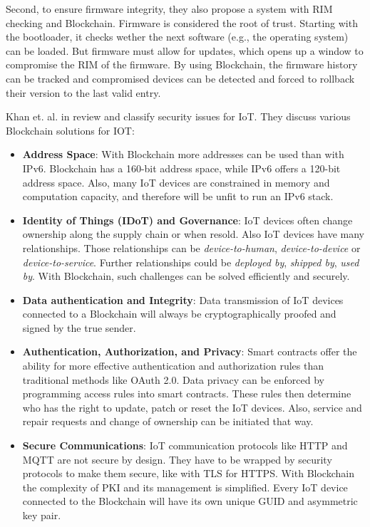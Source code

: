 Second, to ensure firmware integrity, they also propose a system with RIM checking and Blockchain.
Firmware is considered the root of trust. Starting with the bootloader, it checks wether the next software (e.g., the operating system) can be loaded.
But firmware must allow for updates, which opens up a window to compromise the RIM of the firmware. By using Blockchain, the firmware history can be tracked and compromised devices can be detected and forced to rollback their
version to the last valid entry.

Khan et. al. in \cite{Khan2018} review and classify security issues for IoT. They discuss various Blockchain solutions for IOT:

\begin{itemize}
  \item {\textbf{Address Space}: With Blockchain more addresses can be used than with IPv6. Blockchain has a 160-bit address space, while IPv6 offers a 120-bit address space.
  Also, many IoT devices are constrained in memory and computation capacity, and therefore will be unfit to run an IPv6 stack.}
  \item {\textbf{Identity of Things (IDoT) and Governance}: IoT devices often change ownership along the supply chain or when resold. Also IoT devices have many relationships. Those relationships can be \textit{device-to-human}, \textit{device-to-device} or \textit{device-to-service}. Further relationships could be \textit{deployed by}, \textit{shipped by}, \textit{used by}. With Blockchain, such challenges can be solved efficiently and securely.}
  \item {\textbf{Data authentication and Integrity}: Data transmission of IoT devices connected to a Blockchain will always be  cryptographically proofed and signed by the true sender.}
  \item {\textbf{Authentication, Authorization, and Privacy}: Smart contracts offer the ability for more effective authentication and authorization rules than traditional methods like OAuth 2.0. Data privacy can be enforced by programming access rules into smart contracts. These rules then determine who has the right to update, patch or reset the IoT devices. Also, service and repair requests and change of ownership can be initiated that way. }
  \item {\textbf{Secure Communications}: IoT communication protocols like HTTP and MQTT are not secure by design. They have to be wrapped by security protocols to make them secure, like with TLS for HTTPS.
  With Blockchain the complexity of PKI and its management is simplified. Every IoT device connected to the Blockchain will have its own unique GUID and asymmetric key pair. }
\end{itemize}



